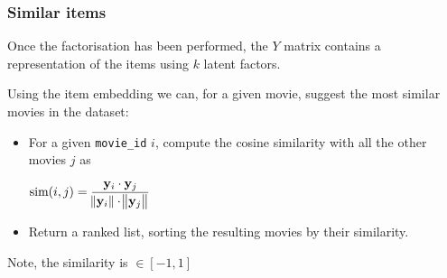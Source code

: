 \documentclass[xcolor = {table}]{beamer}
\begin{document}
  
  \begin{frame}
    \frametitle{Similar items}

    Once the factorisation has been performed, the $Y$ matrix contains a representation of the items using $k$ latent factors.

    \vspace{1em}

    Using the item embedding we can, for a given movie, suggest the most similar movies in the dataset:

    \vspace{1em}

    \begin{itemize}
      \setlength\itemsep{1em}
    \item For a given \texttt{movie\_id} $i$, compute the cosine similarity with all the other movies $j$ as

        \begin{center}
          $\text{sim}(i, j) = \displaystyle\frac{\mathbf{y}_i \cdot \mathbf{y}_j}{\norm{\mathbf{y}_i} \cdot \norm{\mathbf{y}_j}}$
        \end{center}

      \item Return a ranked list, sorting the resulting movies by their similarity.
    \end{itemize}

    \vspace{1em}

    Note, the similarity is $\in [-1, 1]$

  \end{frame}
\end{document}
